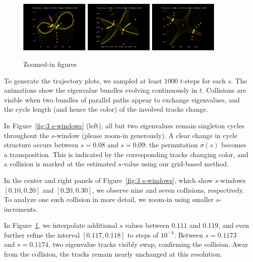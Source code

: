 \documentclass{article}
\begin{document}
	\begin{figure}[htbp]
		\centering
		\includegraphics[width=0.3\textwidth]{figures/Zoomed1.pdf}
		\includegraphics[width=0.3\textwidth]{figures/Zoomed2.pdf}
		\includegraphics[width=0.3\textwidth]{figures/Zoomed3.pdf}
		\caption{Zoomed-in figures}
		\label{fig:zoomed}
	\end{figure}

	To generate the trajectory plots, we sampled at least $1000$ $t$-steps for each $s$. 
	The animations 
	show the eigenvalue bundles evolving continuously in $t$. 
	Collisions are visible when two bundles of parallel paths appear to exchange eigenvalues, 
	and the cycle length (and hence the color) of the involved tracks change. 
	
	In Figure~\ref{fig:3 s-windows} (left), all but two eigenvalues remain singleton cycles 
	throughout the $s$-window (please zoom-in generously). A clear change in cycle structure occurs between 
	$s = 0.08$ and $s = 0.09$: the permutation $\sigma(s)$ becomes a transposition. 
	This is indicated by the corresponding tracks changing color, 
	and a collision is marked at the estimated $s$-value using our grid-based method.
	
	In the center and right panels of Figure~\ref{fig:3 s-windows}, 
	which show $s$-windows $[0.10, 0.20]$ and $[0.20, 0.30]$, 
	we observe nine and seven collisions, respectively. 
	To analyze one such collision in more detail, 
	we zoom-in using smaller $s$-increments.

	In Figure~\ref{fig:zoomed}, we interpolate additional $s$ values between $0.111$ and $0.119$, 
	and even further refine the interval $[0.117, 0.118]$ to steps of $10^{-4}$. 
	Between $s = 0.1173$ and $s = 0.1174$, two eigenvalue tracks visibly swap, 
	confirming the collision. Away from the collision, 
	the tracks remain nearly unchanged at this resolution.
\end{document}
